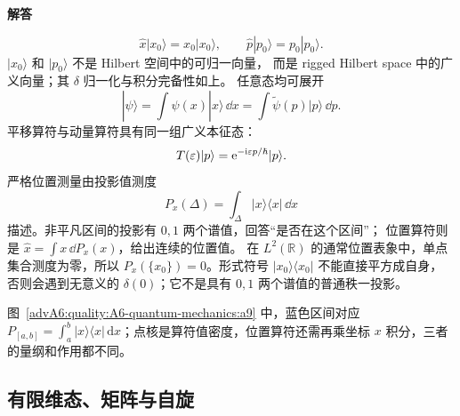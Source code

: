 \begin{advsolution}
\begin{center}\begin{minipage}{.96\linewidth}\centering
\raggedright{\bfseries\color{DeepBlue}解答}\par\smallskip\centering

\label{advA6:quality:A6-quantum-mechanics:a9}
\end{minipage}\end{center}

\[
 \widehat x|x_0\rangle=x_0|x_0\rangle,\qquad
 \widehat p|p_0\rangle=p_0|p_0\rangle.
\]
$|x_0\rangle$ 和 $|p_0\rangle$ 不是 Hilbert 空间中的可归一向量，
而是 rigged Hilbert space 中的广义向量；其 $\delta$ 归一化与积分完备性如上。
任意态均可展开
\[
 |\psi\rangle=\int\psi(x)|x\rangle\,\dd x
 =\int\tilde\psi(p)|p\rangle\,\dd p.
\]
平移算符与动量算符具有同一组广义本征态：
\[
 T(\varepsilon)|p\rangle
 =\mathrm e^{-\mathrm i\varepsilon p/\hbar}|p\rangle.
\]
严格位置测量由投影值测度
\[
 P_x(\Delta)=\int_\Delta|x\rangle\langle x|\,\dd x
\]
描述。非平凡区间的投影有 $0,1$ 两个谱值，回答“是否在这个区间”；
位置算符则是 $\widehat x=\int x\,\dd P_x(x)$，给出连续的位置值。
在 $L^2(\mathbb R)$ 的通常位置表象中，单点集合测度为零，所以
$P_x(\{x_0\})=0$。形式符号 $|x_0\rangle\langle x_0|$ 不能直接平方成自身，
否则会遇到无意义的 $\delta(0)$；它不是具有 $0,1$ 两个谱值的普通秩一投影。

图~\ref{advA6:quality:A6-quantum-mechanics:a9} 中，蓝色区间对应 $P_{[a,b]}=\int_a^b|x\rangle\langle x|\,\mathrm dx$；点核是算符值密度，位置算符还需再乘坐标 $x$ 积分，三者的量纲和作用都不同。
\end{advsolution}

\subsection{有限维态、矩阵与自旋}

